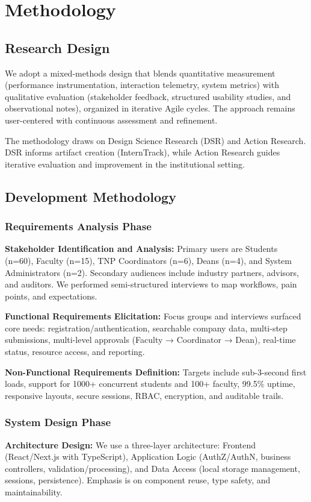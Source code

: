 \documentclass[conference]{IEEEtran}
\begin{document}
\section{Methodology}

\subsection{Research Design}
We adopt a mixed-methods design that blends quantitative measurement (performance instrumentation, interaction telemetry, system metrics) with qualitative evaluation (stakeholder feedback, structured usability studies, and observational notes), organized in iterative Agile cycles. The approach remains user-centered with continuous assessment and refinement.

The methodology draws on Design Science Research (DSR) and Action Research. DSR informs artifact creation (InternTrack), while Action Research guides iterative evaluation and improvement in the institutional setting.

\subsection{Development Methodology}

\subsubsection{Requirements Analysis Phase}
\textbf{Stakeholder Identification and Analysis:} Primary users are Students (n=60), Faculty (n=15), TNP Coordinators (n=6), Deans (n=4), and System Administrators (n=2). Secondary audiences include industry partners, advisors, and auditors. We performed semi-structured interviews to map workflows, pain points, and expectations.

\textbf{Functional Requirements Elicitation:} Focus groups and interviews surfaced core needs: registration/authentication, searchable company data, multi-step submissions, multi-level approvals (Faculty → Coordinator → Dean), real-time status, resource access, and reporting.

\textbf{Non-Functional Requirements Definition:} Targets include sub-3-second first loads, support for 1000+ concurrent students and 100+ faculty, 99.5\% uptime, responsive layouts, secure sessions, RBAC, encryption, and auditable trails.

\subsubsection{System Design Phase}
\textbf{Architecture Design:} We use a three-layer architecture: Frontend (React/Next.js with TypeScript), Application Logic (AuthZ/AuthN, business controllers, validation/processing), and Data Access (local storage management, sessions, persistence). Emphasis is on component reuse, type safety, and maintainability.
\end{document}
